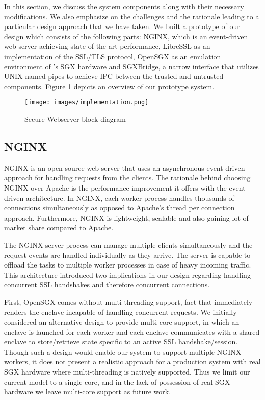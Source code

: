 \documentclass[../main.tex]{subfiles}
\begin{document}
In this section, we discuss the system components along with their
necessary modifications. We also emphasize on the challenges and the rationale
leading to a particular design approach that we have taken. We built a 
prototype of our design which consists of the following parts: NGINX, 
which is an event-driven web server achieving state-of-the-art performance,
LibreSSL as an implementation of the SSL/TLS protocol, OpenSGX as an emulation
environment of \Intel's SGX hardware and SGXBridge, a narrow interface that
utilizes UNIX named pipes to achieve IPC between the trusted and untrusted
components. Figure \ref{fig:implementation-overview} depicts an overview of our
prototype system.

\begin{figure}[H]
  \centering
  \texttt{[image: images/implementation.png]}
  \caption{Secure Webserver block diagram }
  \label{fig:implementation-overview}
\end{figure}

\subsection{NGINX}

NGINX is an open source web server that uses an asynchronous event-driven
approach for handling requests from the clients. The rationale behind choosing
NGINX over Apache is the performance improvement it offers with the event
driven architecture. In NGINX, each worker process handles thousands of
connections simultaneously as opposed to Apache's thread per connection
approach. Furthermore, NGINX is lightweight, scalable and also gaining lot of
market share compared to Apache.

The NGINX server process can manage multiple clients simultaneously and the
request events are handled individually as they arrive. The server is capable
to offload the tasks to multiple worker processes in case of heavy incoming
traffic. This architecture introduced two implications in our design regarding
handling concurrent SSL handshakes and therefore concurrent connections.

First, OpenSGX comes without multi-threading support, fact that immediately
renders the enclave incapable of handling concurrent requests. We initially
considered an alternative design to provide multi-core support, in which an
enclave is launched for each worker and each enclave communicates with a shared
enclave to store/retrieve state specific to an active SSL handshake/session.
Though such a design would enable our system to support multiple NGINX workers,
it does not present a realistic approach for a production system with real SGX
hardware where multi-threading is natively supported. Thus we limit our current
model to a single core, and in the lack of possession of real SGX hardware we
leave multi-core support as future work.
\end{document}
